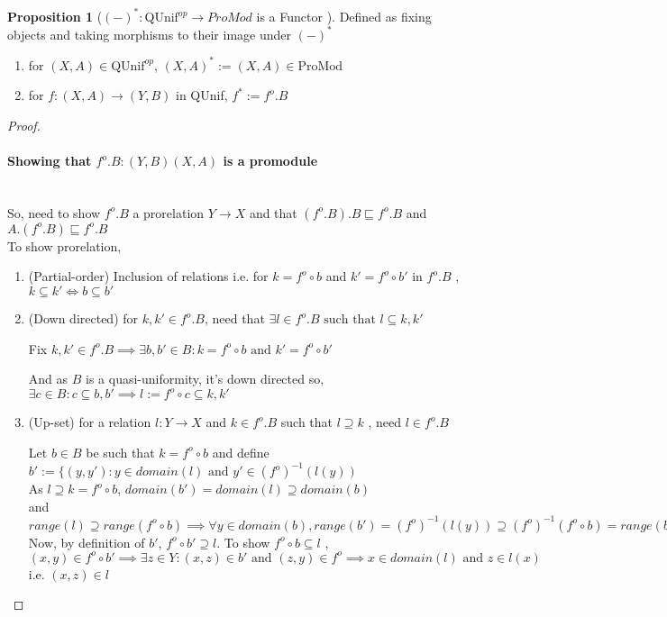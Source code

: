 \documentclass[18pt,a4paper]{article}
\makeatletter
\theoremstyle{definition}
\newtheorem{proop}{Proposition}[section]
\newcommand{\carrow}{}%
\DeclareRobustCommand{\carrow}{%
  \mathrel{\vphantom{\rightarrow}\mathpalette\circle@arrow\relax}%
}
\newcommand{\circle@arrow}[2]{%
  \m@th
  \ooalign{%
    \hidewidth$#1\circ\mkern1mu$\hidewidth\cr
    $#1\longrightarrow$\cr}%
}
\makeatother
\begin{document}
\begin{proop}[$(-)^*:$QUnif$^{op} \to ProMod$ is a Functor ]
	Defined as fixing objects and taking morphisms to their image under $(-)^*$
		\begin{enumerate}[label=(\alph*)]
			\item for $(X,A) \in \text{QUnif}^{op}$, $(X,A)^*:=(X,A) \in \text{ProMod}$
			\item for $f:(X,A) \to (Y,B)$ in QUnif,
				$f^* := f^o .B$
		\end{enumerate}
\end{proop}
\begin{proof}
	\item \paragraph{Showing that $f^o .B: (Y,B) \carrow (X,A)$ is a promodule } \mbox{} \\
	So, need to show $f^o .B$ a prorelation $Y \to X$
	and that $(f^o .B).B \sqsubseteq f^o .B$ and $A.(f^o .B) \sqsubseteq f^o .B$ \\
	To show prorelation, \begin{enumerate}[label=(\roman*)]
		\item (Partial-order) Inclusion of relations i.e. for $k=f^o \circ b$ and
			$k'=f^o \circ b'$ in $f^o .B$ , $k \subseteq k' \iff b \subseteq b'$
		\item (Down directed) for $k,k' \in f^o .B$, need that $\exists l \in f^o .B
		\text{ such that } l \subseteq k,k'$

		Fix $k,k' \in f^o .B \implies \exists b,b' \in B : k=f^o \circ b \text{ and }
		k' = f^o \circ b'$

		And as $B$ is a quasi-uniformity, it's down directed so,
		$\exists c \in B: c \subseteq b,b' \implies l:= f^o \circ c \subseteq k,k'$
	\item (Up-set) for a relation $l:Y \to X$ and $k \in f^o .B$ such that $l \supseteq k$
		 , need $l \in f^o .B$

		 Let $b\in B$ be such that $k=f^o \circ b$ and define
		 $b':=\{(y,y'): y \in domain(l) \text{ and } y' \in (f^o)^{-1}(l(y))$\\
			 As $l\supseteq k=f^o \circ b$, $domain(b')=domain(l)\supseteq domain(b)$
			 \\ and $range(l) \supseteq range(f^o \circ b)\implies
			 \forall y \in domain(b), range (b')=(f^o )^{-1}(l(y)) \supseteq (f^o)^{-1}(f^o \circ b ) = range(b)$\\
			 Now, by definition of $b'$, $f^o \circ b' \supseteq l$. To show
			 $f^o \circ b \subseteq l$ , \\
			 $(x,y)\in f^o \circ b' \implies \exists z \in Y: (x,z)\in b' \text{ and }
			 (z,y) \in f^o \implies x \in domain(l) \text{ and } z \in l(x)$ i.e.
			 $(x,z) \in l$


\end{enumerate}
\end{proof}
\end{document}

